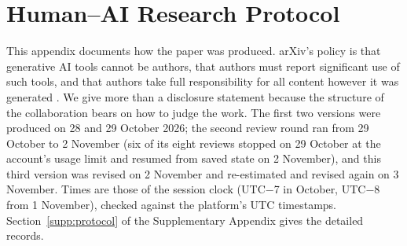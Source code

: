 \section{Human--AI Research Protocol}\label{app:protocol}

This appendix documents how the paper was produced. arXiv's policy is that generative AI tools cannot be authors, that authors must report significant use of such tools, and that authors take full responsibility for all content however it was generated \citep{arxiv2023policy,arxiv2026policy}. We give more than a disclosure statement because the structure of the collaboration bears on how to judge the work. The first two versions were produced on 28 and 29 October 2026; the second review round ran from 29 October to 2 November (six of its eight reviews stopped on 29 October at the account's usage limit and resumed from saved state on 2 November), and this third version was revised on 2 November and re-estimated and revised again on 3 November. Times are those of the session clock (UTC$-$7 in October, UTC$-$8 from 1 November), checked against the platform's UTC timestamps. Section~\ref{supp:protocol} of the Supplementary Appendix gives the detailed records.

